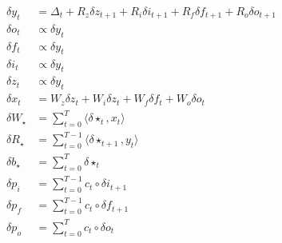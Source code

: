 \documentclass[letterpaper]{article}
\begin{document}
\begin{equation}
\begin{aligned}
\delta y_t &= \Delta_t + R_z\delta z_{t+1} + R_i\delta i_{t+1} + R_f\delta f_{t+1} + R_o\delta o_{t+1}\\
\delta o_{t} &\propto \delta y_{t}\\
\delta f_{t} &\propto \delta y_{t}\\
\delta i_{t} &\propto \delta y_{t}\\
\delta z_{t} &\propto \delta y_{t}\\
\delta x_t &= W_z\delta z_{t} + W_i\delta z_{t} + W_f\delta f_{t} + W_o\delta o_{t}\\
\delta W_{\star} &= \sum\nolimits^T_{t=0} \langle \delta\star_t,x_t\rangle\\
\delta R_{\star} &= \sum\nolimits^{T-1}_{t=0} \langle \delta\star_{t+1},y_t\rangle\\
\delta b_{\star} &= \sum\nolimits^{T}_{t=0} \delta\star_{t}\\
\delta p_{i} &= \sum\nolimits^{T-1}_{t=0} c_t \circ \delta i_{t+1}\\
\delta p_{f} &= \sum\nolimits^{T-1}_{t=0} c_t \circ \delta f_{t+1}\\
\delta p_{o} &= \sum\nolimits^{T}_{t=0} c_t \circ \delta o_{t}\\
\end{aligned}
\end{equation}
\end{document}
